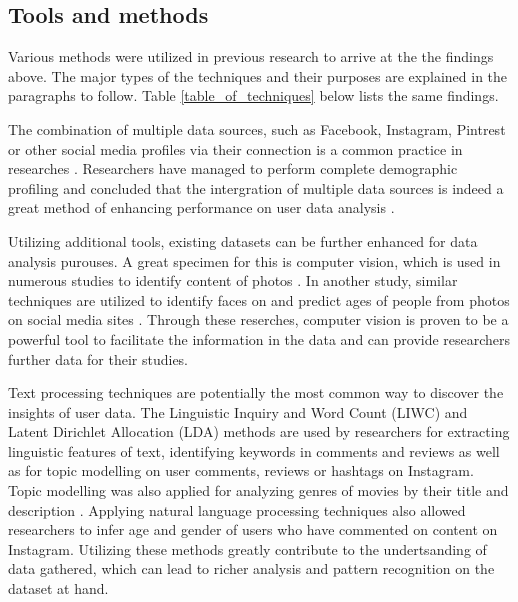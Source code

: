 \subsection{Tools and methods}
Various methods were utilized in previous research to arrive at the the findings above. The major types of the techniques and their purposes are explained in the paragraphs to follow. Table \ref{table_of_techniques} below lists the same findings.

   The combination of multiple data sources, such as Facebook, Instagram, Pintrest or other social media profiles via their connection is a common practice in researches \cite{farseev2015harvestingmultiplesources, ottoni2013ladies}. Researchers have managed to perform complete demographic profiling and concluded that the intergration of multiple data sources is indeed a great method of enhancing performance on user data analysis \cite{farseev2015harvestingmultiplesources}. 
  
  Utilizing additional tools, existing datasets can be further enhanced for data analysis purouses. A great specimen for this is computer vision, which is used in numerous studies to identify content of photos \cite{hu2014we, farseev2015harvestingmultiplesources}. In another study, similar techniques are utilized to identify faces on and predict ages of people from photos on social media sites \cite{han2016teensarefrommars, bakhshi2014faces}. Through these reserches, computer vision is proven to be a powerful tool to facilitate the information in the data and can provide researchers further data for their studies. 

  Text processing techniques are potentially the most common way to discover the insights of user data. The Linguistic Inquiry and Word Count (LIWC) and Latent Dirichlet Allocation (LDA) methods are used by researchers \cite{ottoni2013ladies, farseev2015harvestingmultiplesources, jang2016teensengagemorewithfewerphotos} for extracting linguistic features of text, identifying keywords in comments and reviews as well as for topic modelling on user comments, reviews or hashtags on Instagram. Topic modelling was also applied for analyzing genres of movies by their title and description \cite{kabinsingha2012movie}. Applying natural language processing techniques also allowed researchers to infer age and gender of users \cite{han2016teensarefrommars} who have commented on content on Instagram. Utilizing these methods greatly contribute to the undertsanding of data gathered, which can lead to richer analysis and pattern recognition on the dataset at hand.
   
